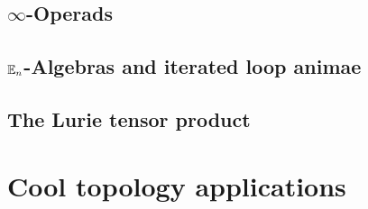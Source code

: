 \documentclass[DIV=12,numbers=enddot,leqno,bibliography=totoc]{scrartcl}
\begin{document}
	\newpage
	
	\subsection{\texorpdfstring{$\infty$}{Infinity}-Operads}\label{subsec:InfinityOperads}
	
	\subsection{\texorpdfstring{$\mathbb{E}_n$}{En}-Algebras and iterated loop animae}\label{subsec:EnAlgebras}
	
	\subsection{The Lurie tensor product}\label{subsec:LurieTensorProduct}
	
	
	\newpage
	\section[Cool topology applications]{Cool topology applications \coolemoji}\label{sec:CoolTopologyApplications}
	
	

	\newpage
	\renewcommand{\ParagraphOrNot}{}
	
	\renewcommand{\bibfont}{\small}
	
	\printbibliography
\end{document}
